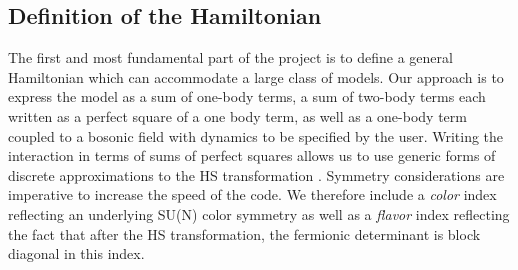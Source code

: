 \subsection{Definition of the Hamiltonian}

The first and most fundamental part of the project  is to define a general Hamiltonian which  can  accommodate a large class of models. 
Our approach is to express the model as a sum of one-body terms, a sum of two-body terms each written as a perfect square of a one body term, as well as a one-body term coupled to a bosonic field with  dynamics to be specified by the user. 
Writing the interaction in terms of sums of perfect squares allows us to use generic forms of  discrete  approximations to the  HS  transformation \cite{Motome97,Assaad97}.
Symmetry considerations  are  imperative to increase the speed of the code.  
We therefore include a \emph{color} index  reflecting  an underlying  SU(N) color symmetry as  well as a \emph{flavor} index  reflecting  the fact that  after  the HS  transformation,  the  fermionic determinant is block diagonal in this index.

